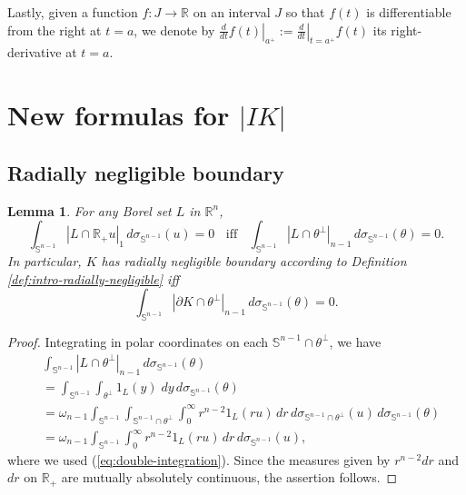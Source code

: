 \documentclass[11pt]{article}
\newtheorem{lemma}[thm]{Lemma}
\theoremstyle{definition}
\theoremstyle{proof}
\newcommand{\dta}[2]{\left . \frac{d}{dt} #1 \right |_{#2^+}}
\DeclareMathOperator{\+}{\mathop{\tilde{+}}}
\newcommand{\R}{\mathbb{R}}
\renewcommand{\S}{\mathbb{S}}
\numberwithin{equation}{section}
\numberwithin{equation}{section}
\begin{document}
\medskip
Lastly, given a function $f : J \rightarrow \R$ on an interval $J$ so that $f(t)$ is differentiable from the right at $t=a$, we denote by $\dta{f(t)}{a} := \left  .\frac{d}{dt} \right |_{t=a^+} f(t)$ its right-derivative at $t=a$. 



\section{New formulas for $|I K|$} \label{sec:formulas}

\subsection{Radially negligible boundary}

\begin{lemma} \label{lem:radially-negligible}
For any Borel set $L$ in $\R^n$,
\begin{equation} \label{eq:radially-negligible}
\int_{\S^{n-1}} |L \cap \R_+ u|_{1} \, d\sigma_{\S^{n-1}}(u)  = 0  \;\; \text{ iff } \;\; 
\int_{\S^{n-1}} |L \cap \theta^{\perp}|_{n-1} \, d\sigma_{\S^{n-1}}(\theta)  = 0 
.
\end{equation}
In particular, $K$ has radially negligible boundary according to Definition  \ref{def:intro-radially-negligible} iff
\[
\int_{\S^{n-1}} |\partial K \cap \theta^{\perp}|_{n-1} \, d\sigma_{\S^{n-1}}(\theta)  = 0  .
\]
\end{lemma}
\begin{proof}
Integrating in polar coordinates on each $\S^{n-1} \cap \theta^{\perp}$, we have
\begin{align*}
& \int_{\S^{n-1}} |L \cap \theta^{\perp}|_{n-1} \, d\sigma_{\S^{n-1}}(\theta) \\
& = \int_{\S^{n-1}} \int_{\theta^{\perp}} 1_{L}(y) \;  dy \, d\sigma_{\S^{n-1}}(\theta) \\
& = \omega_{n-1} \int_{\S^{n-1}} \int_{\S^{n-1} \cap \theta^{\perp}} \int_0^\infty r^{n-2} 1_{L}(r u) \, dr \, d\sigma_{\S^{n-1} \cap \theta^{\perp}}(u)  \, d\sigma_{\S^{n-1}}(\theta) \\
& = \omega_{n-1} \int_{\S^{n-1}} \int_0^\infty r^{n-2} 1_{L}(r u) \, dr \, d\sigma_{\S^{n-1}}(u) ,
\end{align*}
where we used (\ref{eq:double-integration}). 
Since the measures given by $r^{n-2} dr$ and $dr$ on $\R_+$ are mutually absolutely continuous, the assertion follows.
\end{proof} 
\end{document}
